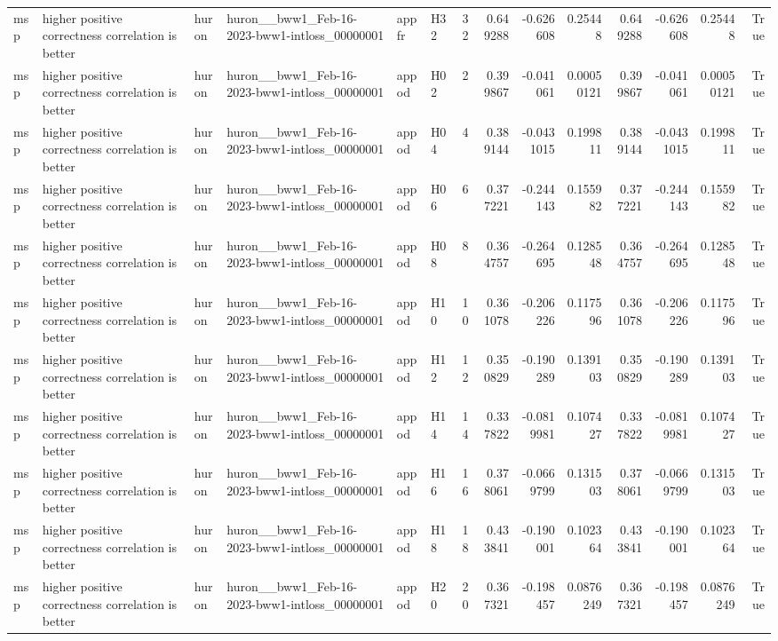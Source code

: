 \begin{longtable}{llllllrrrrrrrr}
msp & higher positive correctness correlation is better & huron & huron\_\_bww1\_Feb-16-2023-bww1-intloss\_00000001 & appfr & H32 & 32 & 0.649288 & -0.626608 & 0.25448 & 0.649288 & -0.626608 & 0.25448 & True \\
msp & higher positive correctness correlation is better & huron & huron\_\_bww1\_Feb-16-2023-bww1-intloss\_00000001 & appod & H02 & 2 & 0.399867 & -0.041061 & 0.00050121 & 0.399867 & -0.041061 & 0.00050121 & True \\
msp & higher positive correctness correlation is better & huron & huron\_\_bww1\_Feb-16-2023-bww1-intloss\_00000001 & appod & H04 & 4 & 0.389144 & -0.0431015 & 0.199811 & 0.389144 & -0.0431015 & 0.199811 & True \\
msp & higher positive correctness correlation is better & huron & huron\_\_bww1\_Feb-16-2023-bww1-intloss\_00000001 & appod & H06 & 6 & 0.377221 & -0.244143 & 0.155982 & 0.377221 & -0.244143 & 0.155982 & True \\
msp & higher positive correctness correlation is better & huron & huron\_\_bww1\_Feb-16-2023-bww1-intloss\_00000001 & appod & H08 & 8 & 0.364757 & -0.264695 & 0.128548 & 0.364757 & -0.264695 & 0.128548 & True \\
msp & higher positive correctness correlation is better & huron & huron\_\_bww1\_Feb-16-2023-bww1-intloss\_00000001 & appod & H10 & 10 & 0.361078 & -0.206226 & 0.117596 & 0.361078 & -0.206226 & 0.117596 & True \\
msp & higher positive correctness correlation is better & huron & huron\_\_bww1\_Feb-16-2023-bww1-intloss\_00000001 & appod & H12 & 12 & 0.350829 & -0.190289 & 0.139103 & 0.350829 & -0.190289 & 0.139103 & True \\
msp & higher positive correctness correlation is better & huron & huron\_\_bww1\_Feb-16-2023-bww1-intloss\_00000001 & appod & H14 & 14 & 0.337822 & -0.0819981 & 0.107427 & 0.337822 & -0.0819981 & 0.107427 & True \\
msp & higher positive correctness correlation is better & huron & huron\_\_bww1\_Feb-16-2023-bww1-intloss\_00000001 & appod & H16 & 16 & 0.378061 & -0.0669799 & 0.131503 & 0.378061 & -0.0669799 & 0.131503 & True \\
msp & higher positive correctness correlation is better & huron & huron\_\_bww1\_Feb-16-2023-bww1-intloss\_00000001 & appod & H18 & 18 & 0.433841 & -0.190001 & 0.102364 & 0.433841 & -0.190001 & 0.102364 & True \\
msp & higher positive correctness correlation is better & huron & huron\_\_bww1\_Feb-16-2023-bww1-intloss\_00000001 & appod & H20 & 20 & 0.367321 & -0.198457 & 0.0876249 & 0.367321 & -0.198457 & 0.0876249 & True \\

\end{longtable}
